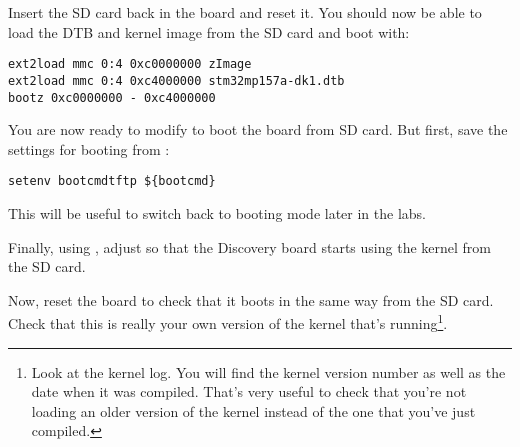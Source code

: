 Insert the SD card back in the board and reset it. You should now be
able to load the DTB and kernel image from the SD card and boot with:

\begin{verbatim}
ext2load mmc 0:4 0xc0000000 zImage
ext2load mmc 0:4 0xc4000000 stm32mp157a-dk1.dtb
bootz 0xc0000000 - 0xc4000000
\end{verbatim}

You are now ready to modify  to boot the board
from SD card. But first, save the settings for booting from
:

\begin{verbatim}
setenv bootcmdtftp ${bootcmd}
\end{verbatim}

This will be useful to switch back to  booting mode
later in the labs.

Finally, using , adjust  so that
the Discovery board starts using the kernel from the SD card.

Now, reset the board to check that it boots in the same way from the
SD card. Check that this is really your own version of the kernel
that's running\footnote{Look at the kernel log. You will find the
kernel version number as well as the date when it was compiled.
That's very useful to check that you're not loading an older version
of the kernel instead of the one that you've just compiled.}.
